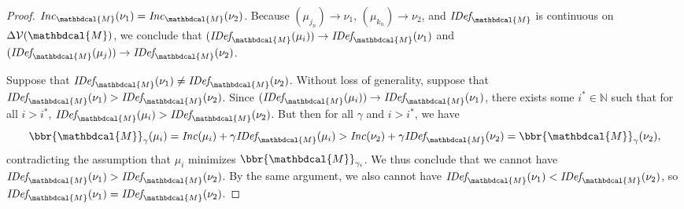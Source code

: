 \documentclass[letterpaper]{article} %
\theoremstyle{plain}
\theoremstyle{definition}
\theoremstyle{remark}
\newcommand{\V}{\mathcal V}
\newcommand{\dg}[1]{\mathbdcal{#1}}
\newcommand{\IDef}[1]{\mathit{IDef}_{\!#1}}
\newcommand\Inc{\mathit{Inc}}
\begin{document}
\begin{proof}
$\Inc_{\dg M}(\nu_1) = \Inc_{\dg M}(\nu_2)$.  
Because  $(\mu_{j_n}) \to \nu_1$, $(\mu_{k_n}) \to \nu_2$, and
$\IDef{\dg M}$ is
continuous on $\Delta\V(\dg M)$,
we conclude that  
$(\IDef{\dg M}(\mu_{i}))\to \IDef{\dg M}(\nu_1)$ and
$(\IDef{\dg M}(\mu_{j}))\to \IDef{\dg M}(\nu_2)$.

Suppose that $\IDef{\dg
M}(\nu_1) \neq \IDef{\dg M}(\nu_2)$. Without loss of generality,
suppose that $\IDef{\dg M}(\nu_1) > \IDef{\dg M}(\nu_2)$. 
Since $(\IDef{\dg M}(\mu_{i})) \to \IDef{\dg M}(\nu_1)$, there exists some $i^*
\in \mathbb N$ such that for all $i > i^*$,  
$ \IDef{\dg M}(\mu_{i}) >  \IDef{\dg M}(\nu_2) $.
But then for all $\gamma$ and $i > i^*$, we have 
\[ \bbr{\dg M}_\gamma(\mu_i) = \Inc(\mu_i) + \gamma\IDef{\dg M}(\mu_i)
> \Inc(\nu_2)  
+ \gamma \IDef{\dg M}(\nu_2) = \bbr{\dg M}_\gamma(\nu_2),\]
contradicting the assumption that $\mu_{i}$ minimizes
$\bbr{\dg M}_{\gamma_{i}}$. We thus conclude that we
cannot have $\IDef{\dg M}(\nu_1) > \IDef{\dg M}(\nu_2)$.  By the same
argument, we also cannot have $\IDef{\dg M}(\nu_1) < \IDef{\dg
  M}(\nu_2)$, so $\IDef{\dg M}(\nu_1) =\IDef{\dg M}(\nu_2)$.  
  

\end{proof}
\end{document}
